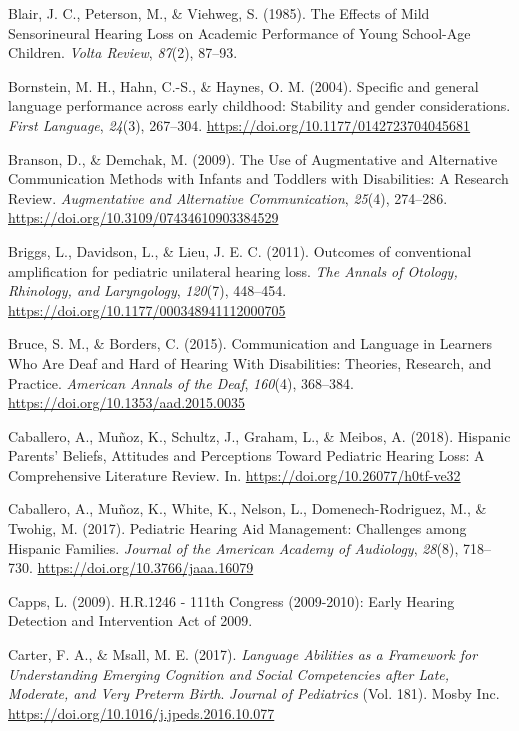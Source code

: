 \documentclass[english,man]{apa6}
\begin{document}
\leavevmode\hypertarget{ref-blair1985}{}%
Blair, J. C., Peterson, M., \& Viehweg, S. (1985). The Effects of Mild Sensorineural Hearing Loss on Academic Performance of Young School-Age Children. \emph{Volta Review}, \emph{87}(2), 87--93.

\leavevmode\hypertarget{ref-bornstein2004}{}%
Bornstein, M. H., Hahn, C.-S., \& Haynes, O. M. (2004). Specific and general language performance across early childhood: Stability and gender considerations. \emph{First Language}, \emph{24}(3), 267--304. \url{https://doi.org/10.1177/0142723704045681}

\leavevmode\hypertarget{ref-branson2009}{}%
Branson, D., \& Demchak, M. (2009). The Use of Augmentative and Alternative Communication Methods with Infants and Toddlers with Disabilities: A Research Review. \emph{Augmentative and Alternative Communication}, \emph{25}(4), 274--286. \url{https://doi.org/10.3109/07434610903384529}

\leavevmode\hypertarget{ref-briggs2011}{}%
Briggs, L., Davidson, L., \& Lieu, J. E. C. (2011). Outcomes of conventional amplification for pediatric unilateral hearing loss. \emph{The Annals of Otology, Rhinology, and Laryngology}, \emph{120}(7), 448--454. \url{https://doi.org/10.1177/000348941112000705}

\leavevmode\hypertarget{ref-bruce2015}{}%
Bruce, S. M., \& Borders, C. (2015). Communication and Language in Learners Who Are Deaf and Hard of Hearing With Disabilities: Theories, Research, and Practice. \emph{American Annals of the Deaf}, \emph{160}(4), 368--384. \url{https://doi.org/10.1353/aad.2015.0035}

\leavevmode\hypertarget{ref-caballero2018}{}%
Caballero, A., Muñoz, K., Schultz, J., Graham, L., \& Meibos, A. (2018). Hispanic Parents' Beliefs, Attitudes and Perceptions Toward Pediatric Hearing Loss: A Comprehensive Literature Review. In. \url{https://doi.org/10.26077/h0tf-ve32}

\leavevmode\hypertarget{ref-caballero2017}{}%
Caballero, A., Muñoz, K., White, K., Nelson, L., Domenech-Rodriguez, M., \& Twohig, M. (2017). Pediatric Hearing Aid Management: Challenges among Hispanic Families. \emph{Journal of the American Academy of Audiology}, \emph{28}(8), 718--730. \url{https://doi.org/10.3766/jaaa.16079}

\leavevmode\hypertarget{ref-capps2009}{}%
Capps, L. (2009). H.R.1246 - 111th Congress (2009-2010): Early Hearing Detection and Intervention Act of 2009.

\leavevmode\hypertarget{ref-carter2017}{}%
Carter, F. A., \& Msall, M. E. (2017). \emph{Language Abilities as a Framework for Understanding Emerging Cognition and Social Competencies after Late, Moderate, and Very Preterm Birth}. \emph{Journal of Pediatrics} (Vol. 181). Mosby Inc. \url{https://doi.org/10.1016/j.jpeds.2016.10.077}
\end{document}

